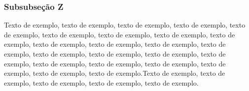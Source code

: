 \subsubsection{Subsubseção Z}

Texto de exemplo, texto de exemplo, texto de exemplo, texto de exemplo, texto de exemplo, texto de exemplo, texto de exemplo, texto de exemplo, texto de exemplo, texto de exemplo, texto de exemplo, texto de exemplo, texto de exemplo, texto de exemplo, texto de exemplo, texto de exemplo, texto de exemplo, texto de exemplo, texto de exemplo, texto de exemplo, texto de exemplo, texto de exemplo, texto de exemplo.Texto de exemplo, texto de exemplo, texto de exemplo, texto de exemplo, texto de exemplo.

